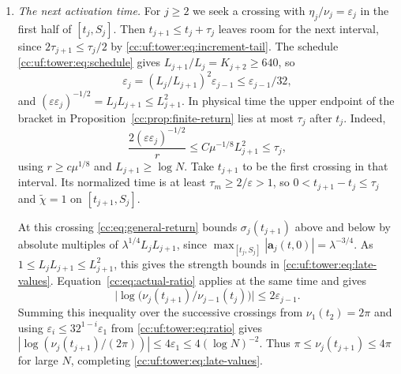 \begin{enumerate}[leftmargin=*]
To check the comparison on this interval, \eqref{cc:uf:tower:eq:derived-low}
at $j-2$ gives $\|B\|_\infty\le\lambda_{j-2}^9\le\mu^{1/32}$ and
$\|B_t\|_\infty\le\mu^{1/16}$, since $\lambda_{j-2}=\mu^{1/K_{j-1}}$
and $K_{j-1}>288$. With $\eta=\nu\varepsilon$, the three terms in
\eqref{cc:uf:tower:eq:active-error} give
\[
 \delta\le C\bigl(\varepsilon^{-1}L_{j+1}^3\mu^{-1/16}
                   +\mu^{-3/32}+\mu^{-1/4}\bigr).
\]
By \eqref{cc:uf:tower:eq:uniform}, $L_j\le L_{j+1}\le(\log\mu)^2$.
Thus $C_0(2r\tau_j)^{C_0}\delta/\varepsilon$ is bounded by
$\mu^{-1/16}$ times a fixed power of $\log\mu$, and
$C_0\varepsilon\le C_0(\log N)^{-2}$. For large $N$ both conditions
of \eqref{cc:eq:finite-smallness} hold. In the resulting central estimates
\eqref{cc:uf:tower:eq:later-origin}, $CS=Cr/(2\nu)\le C\mu^{1/8}L_j$
and $2/(\nu\varepsilon)\le 2L_j^2/\pi$. Both are at most $\mu\le\mathsf D$
for large $N$. This proves \eqref{cc:uf:tower:eq:wave-origin} for wave $j$.

\item \emph{The next activation time.}
For $j\ge2$ we seek a crossing with $\eta_j/\nu_j=\varepsilon_j$ in
the first half of $[t_j,S_j]$. Then $t_{j+1}\le t_j+\tau_j$ leaves
room for the next interval, since $2\tau_{j+1}\le\tau_j/2$ by
\eqref{cc:uf:tower:eq:increment-tail}. The schedule
\eqref{cc:uf:tower:eq:schedule} gives $L_{j+1}/L_j=K_{j+2}\ge640$, so
\begin{equation}\label{cc:uf:tower:eq:ratio}
 \varepsilon_j=(L_j/L_{j+1})^2\varepsilon_{j-1}\le\varepsilon_{j-1}/32,
\end{equation}
and $(\varepsilon\varepsilon_j)^{-1/2}=L_jL_{j+1}\le L_{j+1}^2$.
In physical time the upper endpoint of the bracket in
Proposition~\ref{cc:prop:finite-return} lies at most $\tau_j$ after $t_j$. Indeed,
\[
 \frac{2(\varepsilon\varepsilon_j)^{-1/2}}{r}
 \le C\mu^{-1/8}L_{j+1}^2\le\tau_j ,
\]
using $r\ge c\mu^{1/8}$ and $L_{j+1}\ge\log N$. Take $t_{j+1}$ to be
the first crossing in that interval. Its normalized time is at least
$\tau_m\ge2/\varepsilon>1$, so $0<t_{j+1}-t_j\le\tau_j$ and
$\widetilde\chi=1$ on $[t_{j+1},S_j]$.

At this crossing \eqref{cc:eq:general-return} bounds $\sigma_j(t_{j+1})$
above and below by absolute multiples of $\lambda^{1/4}L_jL_{j+1}$,
since $\max_{[t_j,S_j]}|\mathbf a_j(t,0)|=\lambda^{-3/4}$.
As $1\le L_jL_{j+1}\le L_{j+1}^2$, this gives the strength bounds in
\eqref{cc:uf:tower:eq:late-values}. Equation~\eqref{cc:eq:actual-ratio}
applies at the same time and gives
\[
 \bigl|\log\bigl(\nu_j(t_{j+1})/\nu_{j-1}(t_j)\bigr)\bigr|
 \le2\varepsilon_{j-1}.
\]
Summing this inequality over the successive crossings from
$\nu_1(t_2)=2\pi$ and using
$\varepsilon_i\le32^{1-i}\varepsilon_1$ from \eqref{cc:uf:tower:eq:ratio}
gives $|\log(\nu_j(t_{j+1})/(2\pi))|\le4\varepsilon_1\le4(\log N)^{-2}$.
Thus $\pi\le\nu_j(t_{j+1})\le4\pi$ for large $N$, completing
\eqref{cc:uf:tower:eq:late-values}.


\end{enumerate}
